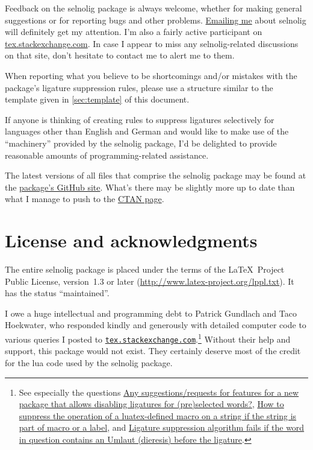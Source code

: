 \documentclass[11pt]{article}
\newcommand{\pkg}[1]{\textsf{#1}}
\begin{document}
Feedback on the \pkg{selnolig} package is always welcome, whether for making general suggestions or for reporting bugs and other problems. \href{mailto:loretan.mico@gmail.com}{Emailing me} about \pkg{selnolig} will definitely get my attention. I'm also a fairly active participant on \url{tex.stackexchange.com}. In case I appear to miss any \pkg{selnolig}-related discussions on that site, don't hesitate to contact me to alert me to them. 

When reporting what you believe to be shortcomings and/or mistakes with the package's ligature suppression rules, please use a structure similar to the template given in \cref{sec:template} of this document. 

If anyone is thinking of creating rules to suppress ligatures selectively for languages other than English and German and would like to make use of the \enquote{machinery} provided by the \pkg{selnolig} package, I'd be delighted to provide reasonable amounts of programming-related assistance.

The latest versions of all files that comprise the \pkg{selnolig} package may be found at the  \href{https://github.com/micoloretan/selnolig}{package's GitHub site}. What's there may be slightly more up to date than what I manage to push to the \href{http://ctan.org/tex-archive/macros/luatex/latex/selnolig}{CTAN page}.


\section{License and acknowledgments} \label{sec:thanks}

The entire \pkg{selnolig} package is placed under the terms of the \LaTeX\ Project Public License, version~1.3 or later (\url{http://www.latex-project.org/lppl.txt}).
It has the status \enquote{maintained}.

I owe a huge intellectual and programming debt to Patrick Gundlach and Taco Hoekwater, who responded kindly and generously with detailed computer code to various queries I posted to \href{http://tex.stackexchange.com}{\texttt{tex.stackexchange.com}}.\footnote{See especially the questions \href{http://tex.stackexchange.com/q/37443/5001}{Any suggestions/requests for features for a new package that allows disabling ligatures for (pre)selected words?}, \href{http://tex.stackexchange.com/q/48516/5001}{How to suppress the operation of a luatex-defined macro on a string if the string is part of macro or a label}, and \href{http://tex.stackexchange.com/q/63005/5001}{Ligature suppression algorithm fails if the word in question contains an Umlaut (dieresis) before the ligature}.} Without their help and support, this package would not exist. They certainly deserve most of the credit for the lua code used by the \pkg{selnolig} package.
\end{document}
